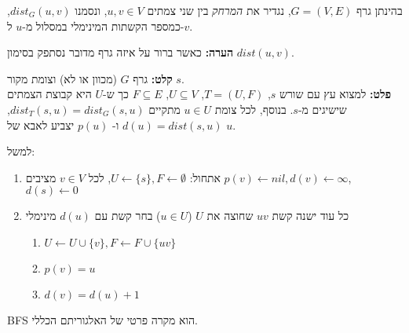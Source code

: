 \begin{definition}[מרחק]
בהינתן גרף 
$G = (V, E)$,
נגדיר את 
\emph{המרחק}
בין שני צמתים 
$u,v \in V$,
ונסמנו 
$dist_G(u,v)$,
כמספר הקשתות המינימלי במסלול מ-$u$ ל-$v$.
\end{definition}

\textbf{הערה:}
כאשר ברור על איזה גרף מדובר נסתפק בסימון 
$dist(u,v)$.

\vspace{5mm}
\textbf{קלט:}
גרף $G$ (מכוון או לא) וצומת מקור $s$.
\\
\textbf{פלט:}
למצוא עץ עם שורש $s$,
$T = (U, F)$, 
$U \subseteq V$, 
$F \subseteq E$
כך ש-$U$ היא קבוצת הצמתים שישיגים מ-$s$.
בנוסף, לכל צומת 
$u \in U$
מתקיים
$dist_T(s, u) = dist_G(s, u)$,
$d(u) = dist(s,u)$
ו-%
$p(u)$
יצביע לאבא של 
$u$.

למשל:
\begin{center}
\end{center}

\begin{enumerate}
\item
אתחול:
$U \leftarrow \{s\}, F \leftarrow \emptyset$, 
לכל 
$v \in V$
מציבים
$p(v) \leftarrow nil, d(v) \leftarrow \infty$,
$d(s) \leftarrow 0$
\item 
\label{item:bfs:while}
כל עוד ישנה קשת 
$uv$
שחוצה את $U$ 
($u \in U$)
בחר קשת עם 
$d(u)$
מינימלי
	\begin{enumerate}
	\item
	$U \leftarrow U \cup \{v\}, F \leftarrow F \cup \{uv\}$
	\item
	$p(v) = u$
	\item
	$d(v) = d(u) + 1$
	\end{enumerate}
\end{enumerate}
BFS
הוא מקרה פרטי של האלגוריתם הכללי.

